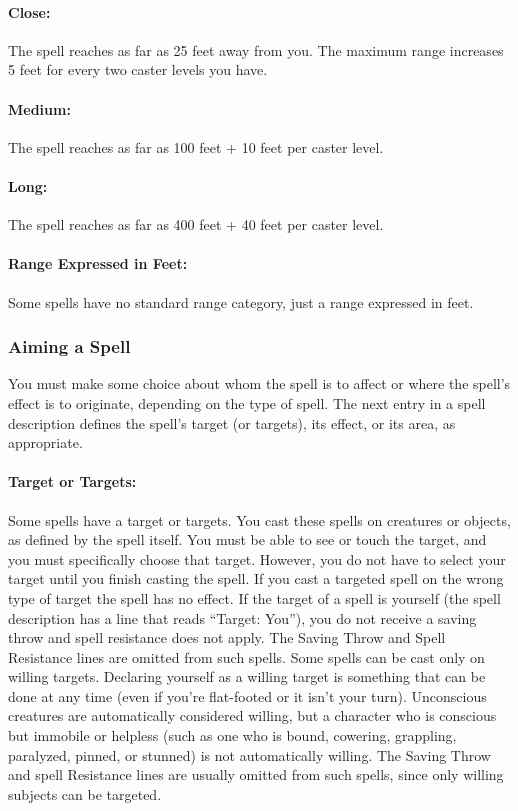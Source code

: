 \paragraph{Close:} The spell reaches as far as 25 feet away from you. The maximum range increases 5 feet for every two caster levels you have.

\paragraph{Medium:} The spell reaches as far as 100 feet + 10 feet per caster level.

\paragraph{Long:} The spell reaches as far as 400 feet + 40 feet per caster level.

\paragraph{Range Expressed in Feet:} Some spells have no standard range category, just a range expressed in feet.

\subsubsection{Aiming a Spell}
You must make some choice about whom the spell is to affect or where the spell's effect is to originate, 
depending on the type of spell. The next entry in a spell description defines the spell's target (or targets), its effect, or its area, as appropriate.

\paragraph{Target or Targets:} Some spells have a target or targets. You cast these spells on creatures or objects, as defined by the spell itself. 
You must be able to see or touch the target, and you must specifically choose that target. 
However, you do not have to select your target until you finish casting the spell.
If you cast a targeted spell on the wrong type of target the spell has no effect. 
If the target of a spell is yourself (the spell description has a line that reads “Target: You”), 
you do not receive a saving throw and spell resistance does not apply. 
The Saving Throw and Spell Resistance lines are omitted from such spells.
Some spells can be cast only on willing targets. 
Declaring yourself as a willing target is something that can be done at any time (even if you're flat-footed or it isn't your turn). 
Unconscious creatures are automatically considered willing, 
but a character who is conscious but immobile or helpless (such as one who is bound, cowering, grappling, paralyzed, pinned, or stunned) is not automatically willing. 
The Saving Throw and spell Resistance lines are usually omitted from such spells, since only willing subjects can be targeted.


